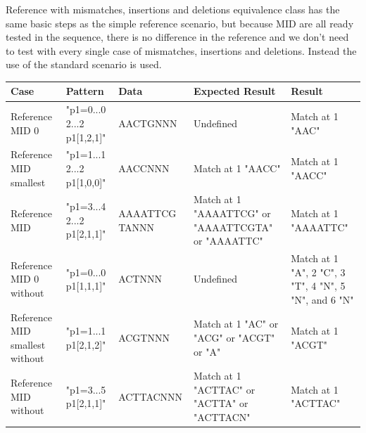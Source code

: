 \documentclass[12pt]{article}
\begin{document}
Reference with mismatches, insertions and deletions equivalence class has the same basic steps as the simple reference
scenario, but because MID are all ready tested in the sequence, there is no difference in the reference and we don't
need to test with every single case of mismatches, insertions and deletions. Instead the use of the standard scenario is 
used.
\begin{table}[H]
\begin{tabular}{p{4cm}|p{3cm}|p{2.5cm}|p{2.5cm}|p{2.5cm}}
Case 			& Pattern & Data & Expected Result & Result \\ \hline
\rowcolor{lightred}
Reference MID 0 & "p1=0...0 2...2 p1[1,2,1]" & AACTGNNN & Undefined & Match at 1 "AAC" \\ \hline
\rowcolor{lightgreen}
Reference MID smallest & "p1=1...1 2...2 p1[1,0,0]" & AACCNNN & Match at 1 "AACC" & Match at 1 "AACC" \\ \hline
\rowcolor{lightgreen}
Reference MID & "p1=3...4 2...2 p1[2,1,1]" & AAAATTCG TANNN & Match at 1 "AAAATTCG" or "AAAATTCGTA" or "AAAATTC" & Match at 1 "AAAATTC"\\ \hline
\rowcolor{lightred}
Reference MID 0 without & "p1=0...0 p1[1,1,1]" & ACTNNN & Undefined & Match at 1 "A", 2 "C", 3 "T", 4 "N", 5 "N", and 6 "N" \\ \hline
\rowcolor{lightgreen}
Reference MID smallest without & "p1=1...1 p1[2,1,2]" & ACGTNNN & Match at 1 "AC" or "ACG" or "ACGT" or "A" & Match at 1 "ACGT" \\ \hline
\rowcolor{lightgreen}
Reference MID without & "p1=3...5 p1[2,1,1]" & ACTTACNNN & Match at 1 "ACTTAC" or "ACTTA" or "ACTTACN" & Match at 1 "ACTTAC" \\ \hline
\end{tabular}
\end{table}
\end{document}
